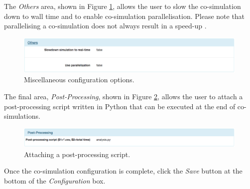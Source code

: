 The \emph{Others} area, shown in Figure \ref{fig:others-conf}, allows the user to slow the co-simulation down to wall time and to enable co-simulation parallelisation.  Please note that parallelising a co-simulation does not always result in a speed-up \cite{Thule&16c}.
%
%
%
\begin{figure}[ht]
\centering
\includegraphics[width=\textwidth]{./figures/app/others}
\caption{Miscellaneous configuration options.}
\label{fig:others-conf}
\end{figure}
%
%
%

The final area, \emph{Post-Processing}, shown in Figure \ref{fig:postprocess}, allows the user to attach a post-processing script written in Python that can be executed at the end of co-simulations.
%
%
%
\begin{figure}[ht]
\centering
\includegraphics[width=\textwidth]{./figures/app/postProcessing}
\caption{Attaching a post-processing script.}
\label{fig:postprocess}
\end{figure}
%
%
%

Once the co-simulation configuration is complete, click the \textit{Save}
button at the bottom of the \textit{Configuration} box.

